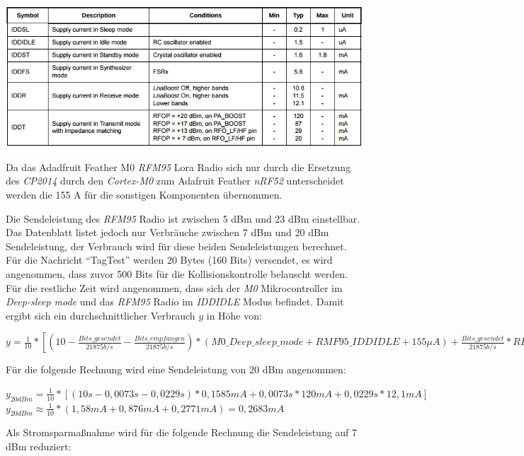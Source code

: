 \begin{table}[h]
  \centering
  \caption{Stromverbrauch des \emph{RFM95}, aus \cite{hope2006rfm}}
	\includegraphics[width=\textwidth]{images/lorapower.png}
  \label{table:lorapower}
\end{table}

Da das Adadfruit Feather M0 \emph{RFM95} Lora Radio sich nur durch die Ersetzung des \emph{CP2014} durch den \emph{Cortex-M0} zum Adafruit Feather \emph{nRF52} unterscheidet werden die 155 \textmu A für die sonstigen Komponenten übernommen.

Die Sendeleistung des \emph{RFM95} Radio ist zwischen 5 dBm und 23 dBm einstellbar. 
Das Datenblatt listet jedoch nur Verbräuche zwischen 7 dBm und 20 dBm Sendeleistung, der Verbrauch wird für diese beiden Sendeleistungen berechnet.
Für die Nachricht "`TagTest"' werden 20 Bytes (160 Bits) versendet, es wird angenommen, dass zuvor 500 Bits für die Kollisionskontrolle belauscht werden.
Für die restliche Zeit wird angenommen, dass sich der \emph{M0} Mikrocontroller im \emph{Deep-sleep mode} und das \emph{RFM95} Radio im \emph{IDDIDLE} Modus befindet.
Damit ergibt sich ein durchschnittlicher Verbrauch $y$ in Höhe von: 

$y = \frac{1}{10} * [(10 - \frac{Bits\_gesendet}{21875 b/s} - \frac{Bits\_empfangen}{21875 b/s}) * (M0\_Deep\_sleep\_mode + RMF95\_IDDIDLE + 155 {\mu}A) + \frac{Bits\_gesendet}{21875 b/s} * RFM95\_XdBm + \frac{Bits\_empfangen}{21875 b/s} * RFM95\_IDDR]$

Für die folgende Rechnung wird eine Sendeleistung von 20 dBm angenommen:

$y_{20dBm} = \frac{1}{10} * [(10s - 0,0073s - 0,0229s) * 0,1585mA + 0,0073s * 120mA + 0,0229s * 12,1mA]$\\[0.5cm]
$y_{20dBm} \approx \frac{1}{10} * (1,58mA + 0,876mA + 0,2771mA) = 0,2683mA$

Als Stromsparmaßnahme wird für die folgende Rechnung die Sendeleistung auf 7 dBm reduziert:

